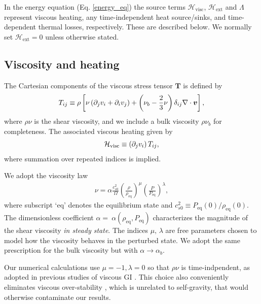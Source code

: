 In the energy equation (Eq. \ref{energy_eq}) the source terms 
$\mathcal{H}_\mathrm{visc}$, $\mathcal{H}_\mathrm{ext}$ and $\Lambda$
represent viscous heating, any time-independent heat
source/sinks, and time-dependent thermal losses, respectively. These
are described below. We normally set
$\mathcal{H}_\mathrm{ext}=0$ unless otherwise stated. 

\subsection{Viscosity and heating}\label{visc_model}
The Cartesian components of the viscous stress tensor $\bm{T}$ is
defined by 
\begin{align}
  T_{ij} \equiv \rho \left[\nu \left(\partial_j v_i + \partial_i v_j\right) +
    \left(\nu_b-\frac{2}{3}\nu\right)\delta_{ij}\nabla\cdot\bm{v}\right], 
\end{align}
where $\rho\nu$ is the shear viscosity, and we include a bulk
viscosity $\rho\nu_b$ for completeness.  
The associated viscous heating given by
\begin{align}
  \mathcal{H}_\mathrm{visc} \equiv \left(\partial_jv_i\right)T_{ij}, 
\end{align}
where summation over repeated indices is implied. 

We adopt the viscosity law  
\begin{align}
  \nu = \alpha
  \frac{c_{s0}^2}{\Omega}\left(\frac{\rho}{\rho_\mathrm{eq}}\right)^\mu\left(\frac{P}{P_\mathrm{eq}}\right)^\lambda,            
\end{align}
where subscript `eq' denotes the equilibrium state and  
$c_{s0}^2\equiv P_\mathrm{eq}(0)/\rho_\mathrm{eq}(0)$. 
The dimensionless coefficient
$\alpha=~\alpha(\rho_\mathrm{eq},P_\mathrm{eq})$ characterizes the
magnitude of the shear viscosity \emph{in steady state}. The indices
$\mu,\,\lambda$ are free parameters chosen to model how the viscosity
behaves in the perturbed state.  
We adopt the same prescription for the bulk viscosity but
with $\alpha\to\alpha_b$.   

Our numerical calculations use $\mu=-1,\lambda=0$ so 
that $\rho\nu$ is time-indpendent, as adopted in previous 
studies of viscous GI 
\citep{lynden-bell74,hunter83,willerding92,gammie96}.  
This choice also conveniently eliminates viscous over-stability
\citep{schmit95,latter06}, which is unrelated to self-gravity, that
would otherwise contaminate our results. %

